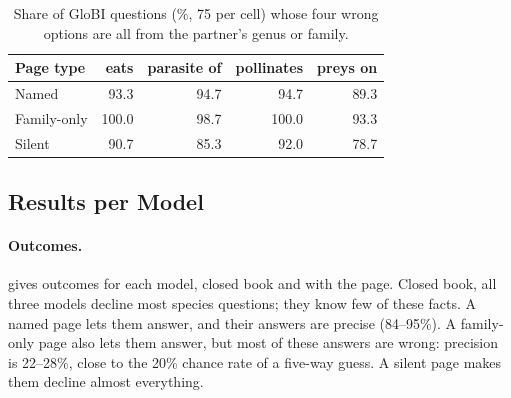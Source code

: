 \begin{table}[t]
\centering
\footnotesize
\setlength{\tabcolsep}{3.5pt}
\begin{tabular}{@{}lrrrr@{}}
\toprule
Page type & eats & parasite of & pollinates & preys on \\
\midrule
Named & 93.3 & 94.7 & 94.7 & 89.3 \\
Family-only & 100.0 & 98.7 & 100.0 & 93.3 \\
Silent & 90.7 & 85.3 & 92.0 & 78.7 \\
\bottomrule
\end{tabular}
\caption{Share of GloBI questions (\%, 75 per cell) whose four wrong options are all from the partner's genus or family.}
\label{tab:globi_sib}
\end{table}

\subsection{Results per Model}

\paragraph{Outcomes.}
 gives outcomes for each model, closed book and with the page. Closed book, all three models decline most species questions; they know few of these facts. A named page lets them answer, and their answers are precise (84--95\%). A family-only page also lets them answer, but most of these answers are wrong: precision is 22--28\%, close to the 20\% chance rate of a five-way guess. A silent page makes them decline almost everything.

